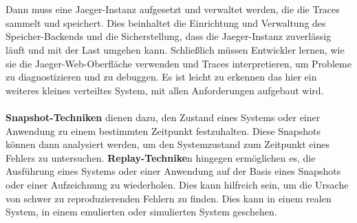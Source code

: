 \\\\
Dann muss eine Jaeger-Instanz aufgesetzt und verwaltet werden, die die Traces sammelt und speichert. Dies beinhaltet die Einrichtung und Verwaltung des Speicher-Backends und die Sicherstellung, dass die Jaeger-Instanz zuverlässig läuft und mit der Last umgehen kann. Schließlich müssen Entwickler lernen, wie sie die Jaeger-Web-Oberfläche verwenden und Traces interpretieren, um Probleme zu diagnostizieren und zu debuggen.
Es ist leicht zu erkennen das hier ein weiteres kleines verteiltes System, mit allen Anforderungen aufgebaut wird. 
\\\\
\textbf{Snapshot-Techniken} dienen dazu, den Zustand eines Systems oder einer Anwendung zu einem bestimmten Zeitpunkt festzuhalten. Diese Snapshots können dann analysiert werden, um den Systemzustand zum Zeitpunkt eines Fehlers zu untersuchen. \textbf{Replay-Technike}n hingegen ermöglichen es, die Ausführung eines Systems oder einer Anwendung auf der Basis eines Snapshots oder einer Aufzeichnung zu wiederholen. Dies kann hilfreich sein, um die Ursache von schwer zu reproduzierenden Fehlern zu finden. Dies kann in einem realen System, in einem emulierten oder simulierten System geschehen. 

